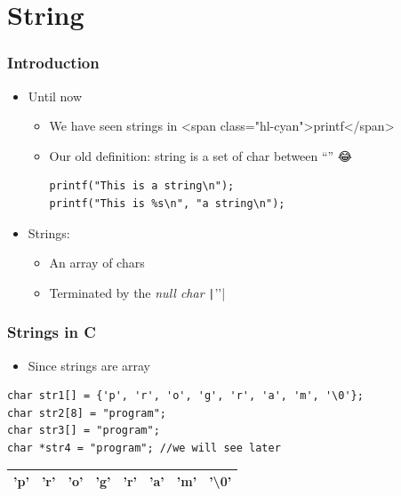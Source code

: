 \documentclass{../c-lecture}
\begin{document}
\section{String}

\begin{frame}[fragile]
  \frametitle{Introduction}
  \begin{itemize}
    \item Until now
    \begin{itemize}
      \item We have seen strings in <span class="hl-cyan">printf</span>
      \item Our old definition: string is a set of char between “” 😂
      \begin{verbatim}
printf("This is a string\n");
printf("This is %s\n", "a string\n");
      \end{verbatim}
    \end{itemize}
    \item Strings:
    \begin{itemize}
      \item An array of chars
      \item Terminated by the \textit{\color{Orange} null char} \texttt|'\0'|
    \end{itemize}
  \end{itemize}
\end{frame}

\begin{frame}[fragile]
  \frametitle{Strings in C}
  \begin{itemize}
    \item Since strings are array
  \end{itemize}
  \begin{verbatim}
char str1[] = {'p', 'r', 'o', 'g', 'r', 'a', 'm', '\0'};
char str2[8] = "program";
char str3[] = "program";
char *str4 = "program"; //we will see later
  \end{verbatim}
  \begin{table}
  \begin{tabular}{*{8}{c}}
    \toprule
    'p' &
    'r' &
    'o' &
    'g' &
    'r' &
    'a' &
    'm' &
    {\color{Orange} '\textbackslash 0'} \\
    \bottomrule
  \end{tabular}
  \end{table}
\end{frame}
\end{document}
